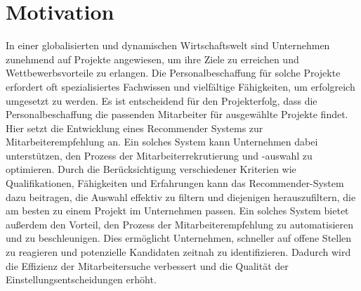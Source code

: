 \documentclass[a4paper,12pt]{scrreprt}
\newcommand{\hiddenchapter}[1]{
	\chapter*{{#1}}
}
\begin{document}
\pagestyle{empty}




\pagestyle{fancy}

\newpage

\newpage

\setcounter{page}{1}
\pagestyle{fancy}
\setcounter{chapter}{0}
\newpage

\hiddenchapter{Motivation}
In einer globalisierten und dynamischen Wirtschaftswelt sind Unternehmen zunehmend auf Projekte angewiesen, um ihre Ziele zu erreichen und Wettbewerbsvorteile zu erlangen. Die Personalbeschaffung für solche Projekte erfordert oft spezialisiertes Fachwissen und vielfältige Fähigkeiten, um erfolgreich umgesetzt zu werden. Es ist entscheidend für den Projekterfolg, dass die Personalbeschaffung die passenden Mitarbeiter für ausgewählte Projekte findet. Hier setzt die Entwicklung eines Recommender Systems zur Mitarbeiterempfehlung an. Ein solches System kann Unternehmen dabei unterstützen, den Prozess der Mitarbeiterrekrutierung und -auswahl zu optimieren. Durch die Berücksichtigung verschiedener Kriterien wie Qualifikationen, Fähigkeiten und Erfahrungen kann das Recommender-System dazu beitragen, die Auswahl effektiv zu filtern und diejenigen herauszufiltern, die am besten zu einem Projekt im Unternehmen passen. Ein solches System bietet außerdem den Vorteil, den Prozess der Mitarbeiterempfehlung zu automatisieren und zu beschleunigen. Dies ermöglicht Unternehmen, schneller auf offene Stellen zu reagieren und potenzielle Kandidaten zeitnah zu identifizieren. Dadurch wird die Effizienz der Mitarbeitersuche verbessert und die Qualität der Einstellungsentscheidungen erhöht.\\
\end{document}

